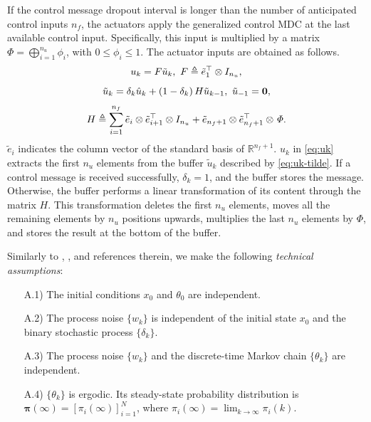 \documentclass[letterpaper, 10 pt, conference]{ieeeconf}  %
\begin{document}
If the control message dropout interval is longer than the number of anticipated control inputs $n_f$, the actuators apply the generalized control MDC at the last available control input.  Specifically, this input is multiplied by a matrix $\mathit{\Phi}=\bigoplus_{i=1}^{n_u} \phi_i$, with $0 \leq \phi_i \leq 1$. 
The actuator inputs are obtained as follows.
\begin{equation}\label{eq:uk}
    \text{\small $u_k = F \tilde{u}_k,~F \triangleq \tilde{e}_{1}^{\top} \otimes I_{n_u}$},
\end{equation}
\begin{equation}\label{eq:uk-tilde}
    \text{\small $\tilde{u}_k = \delta_k \hat{u}_k + \left(1-\delta_k\right) H \tilde{u}_{k-1},~\tilde{u}_{-1} = \mathbf{0}$},
\end{equation}
\begin{equation}\label{eq:H}
    \text{\small $H \triangleq \sum_{i=1}^{n_f} \tilde{e}_{i} \otimes \tilde{e}_{i+1}^{\top} \otimes I_{n_u} + 
    \tilde{e}_{n_f+1} \otimes \tilde{e}_{n_f+1}^{\top} \otimes \mathit{\Phi}$}.
\end{equation}
$\tilde{e}_{i}$ indicates the column vector of the standard basis of $\mathbb{R}^{n_f+1}$.
$u_k$ in \eqref{eq:uk} extracts the first $n_u$ elements from the buffer $\tilde{u}_k$ described by \eqref{eq:uk-tilde}.
If a control message is received successfully, $\delta_k = 1$, and the buffer stores the message. Otherwise, the buffer performs a linear transformation of its content through the matrix $H$. This transformation deletes the first $n_u$ elements,  moves all the remaining elements by $n_u$ positions upwards, multiplies the last $n_u$ elements by $\mathit{\Phi}$, and stores the result at the bottom of the buffer.

Similarly to \cite{yZL-2025-automatica}, \cite{impicciatore2024tac}, and references therein, we make the following \emph{technical assumptions}:
\begin{enumerate}
	\item[A.1)] The initial conditions $x_0$ and $\theta_0$ are independent. %
	\item[A.2)] The process noise $\{w_k\}$ is independent of the initial state $x_0$ and the binary stochastic process $\{\delta_k\}$.
	\item[A.3)] The process noise $\{w_k\}$ and the discrete-time Markov chain $\{\theta_k\}$ are independent.
	\item[A.4)] %
    $\{\theta_k\}$ is ergodic. Its steady-state probability distribution is $\bm{\pi}(\infty) = [\pi_{i}(\infty)]_{i=1}^{N}$, where $\pi_{i}(\infty) = \lim_{k\to\infty} \pi_{i}(k)$.
\end{enumerate}
\end{document}
